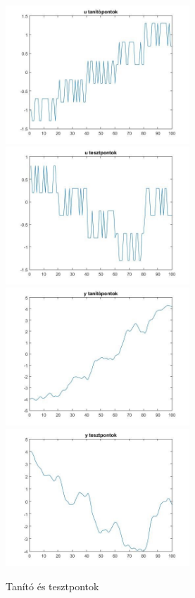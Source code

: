 \begin{figure}[!h]
	\centering
	\includegraphics[width=69mm, keepaspectratio]{figures/m05/u_1.jpg}\hspace{5mm}
	\includegraphics[width=69mm, keepaspectratio]{figures/m05/u_2.jpg}\\\vspace{5mm}
	\includegraphics[width=69mm, keepaspectratio]{figures/m05/y_1.jpg}\hspace{5mm}
	\includegraphics[width=69mm, keepaspectratio]{figures/m05/y_2.jpg}
	\caption{Tanító és tesztpontok}
	\label{fig:poi}
\end{figure}
\newpage

